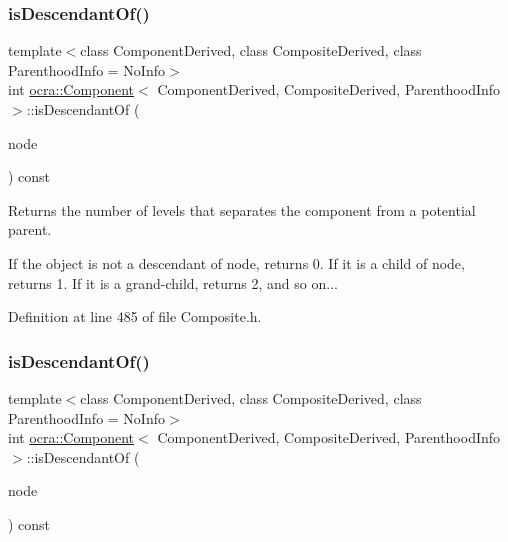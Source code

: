 \hypertarget{classocra_1_1Component_a6ed1720bbd5d8f3ef0b10aed73c36f6e}{}\label{classocra_1_1Component_a6ed1720bbd5d8f3ef0b10aed73c36f6e} 
\subsubsection{\texorpdfstring{is\+Descendant\+Of()}{isDescendantOf()}\hspace{0.1cm}{\footnotesize\ttfamily [1/2]}}
{\footnotesize\ttfamily template$<$class Component\+Derived, class Composite\+Derived, class Parenthood\+Info = No\+Info$>$ \\
int \hyperlink{classocra_1_1Component}{ocra\+::\+Component}$<$ Component\+Derived, Composite\+Derived, Parenthood\+Info $>$\+::is\+Descendant\+Of (\begin{DoxyParamCaption}\item[{const Composite\+Derived \&}]{node }\end{DoxyParamCaption}) const\hspace{0.3cm}{\ttfamily [inline]}}



Returns the number of levels that separates the component from a potential parent. 

If the object is not a descendant of node, returns 0. If it is a child of node, returns 1. If it is a grand-\/child, returns 2, and so on... 

Definition at line 485 of file Composite.\+h.

\hypertarget{classocra_1_1Component_a27fb70e09c4e981077d42ca196301cd3}{}\label{classocra_1_1Component_a27fb70e09c4e981077d42ca196301cd3} 
\subsubsection{\texorpdfstring{is\+Descendant\+Of()}{isDescendantOf()}\hspace{0.1cm}{\footnotesize\ttfamily [2/2]}}
{\footnotesize\ttfamily template$<$class Component\+Derived, class Composite\+Derived, class Parenthood\+Info = No\+Info$>$ \\
int \hyperlink{classocra_1_1Component}{ocra\+::\+Component}$<$ Component\+Derived, Composite\+Derived, Parenthood\+Info $>$\+::is\+Descendant\+Of (\begin{DoxyParamCaption}\item[{const Component\+Derived \&}]{node }\end{DoxyParamCaption}) const\hspace{0.3cm}{\ttfamily [inline]}}



